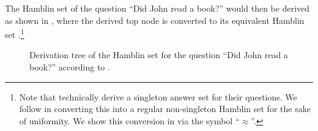 \xe
The Hamblin set of the question \enquote{Did John read a book?} would then be derived as shown in , where the derived top node is converted to its equivalent Hamblin set \parencite[cf.][p.~206,~Footnote~7]{Guerzoni2014-enviro}.\footnote{Note that \textcite{Guerzoni2014-enviro} technically derive a singleton answer set for their questions. We follow \textcite{Crnic2014-nm} in converting this into a regular non-singleton Hamblin set for the sake of uniformity. We show this conversion in  via the symbol \enquote{$\approx$}.}
\begin{figure}[!htb]
    \centering
    \resizebox{\linewidth}{!}{} 
    \caption{Derivation tree of the Hamblin set for the question \enquote{Did John read a book?} according to \textcite{Guerzoni2014-enviro}.}
\end{figure}


